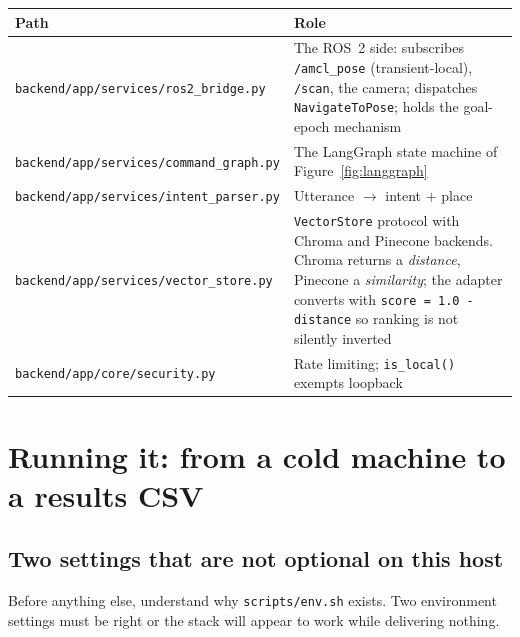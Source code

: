 \documentclass[11pt,a4paper]{report}
\newcommand{\file}[1]{\texttt{\small #1}}
\begin{document}
\begin{center}
\small
\begin{tabular}{@{}p{}p{}@{}}
\toprule
\textbf{Path} & \textbf{Role} \\
\midrule
\file{backend/app/services/ros2\_bridge.py} &
  The ROS~2 side: subscribes \file{/amcl\_pose} (transient-local), \file{/scan},
  the camera; dispatches \file{NavigateToPose}; holds the goal-epoch mechanism \\
\file{backend/app/services/command\_graph.py} &
  The LangGraph state machine of Figure~\ref{fig:langgraph} \\
\file{backend/app/services/intent\_parser.py} &
  Utterance $\rightarrow$ intent $+$ place \\
\file{backend/app/services/vector\_store.py} &
  \file{VectorStore} protocol with Chroma and Pinecone backends. Chroma
  returns a \emph{distance}, Pinecone a \emph{similarity}; the adapter converts
  with \file{score = 1.0 - distance} so ranking is not silently inverted \\
\file{backend/app/core/security.py} &
  Rate limiting; \file{is\_local()} exempts loopback \\
\bottomrule
\end{tabular}
\end{center}

\chapter{Running it: from a cold machine to a results CSV}
\label{ch:run}

\section{Two settings that are not optional on this host}

Before anything else, understand why \file{scripts/env.sh} exists. Two
environment settings must be right or the stack will appear to work while
delivering nothing.
\end{document}
